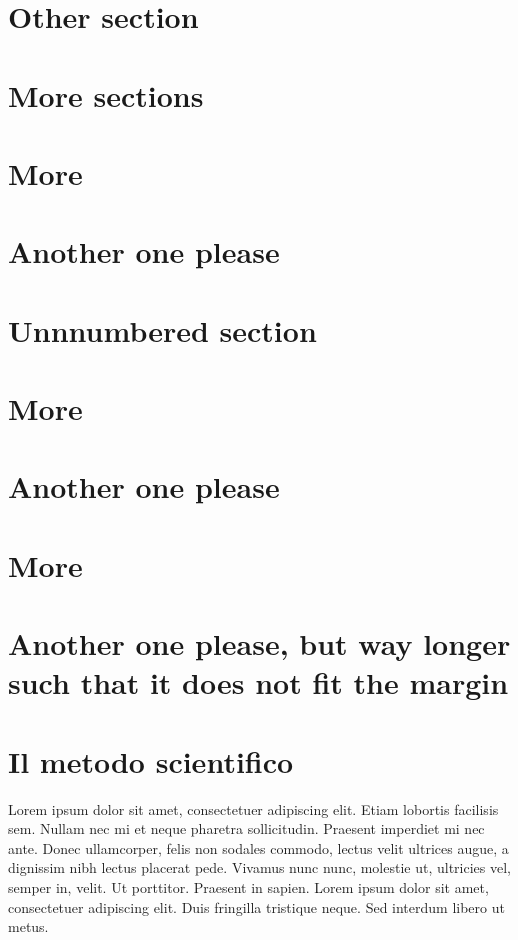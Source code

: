 \documentclass{book}
\begin{document}
\section{Other section}
\section{More sections}
\section{More}
\section{Another one please}
\section*{Unnnumbered section}
\section{More}
\section{Another one please}
\section{More}
\section{Another one please, but way longer such that it does not fit the margin}








\section{Il metodo scientifico}\marginpar{\minitoc}
Lorem ipsum dolor sit amet, consectetuer adipiscing elit. Etiam lobortis facilisis
sem. Nullam nec mi et neque pharetra sollicitudin. Praesent imperdiet mi nec
ante. Donec ullamcorper, felis non sodales commodo, lectus velit ultrices augue,
a dignissim nibh lectus placerat pede. Vivamus nunc nunc, molestie ut, ultricies
vel, semper in, velit. Ut porttitor. Praesent in sapien. Lorem ipsum dolor sit
amet, consectetuer adipiscing elit. Duis fringilla tristique neque. Sed interdum
libero ut metus. 
\end{document}
